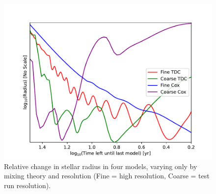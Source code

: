 \begin{figure}[H]
\begin{center}
    \includegraphics[width=0.8\linewidth]{Figures/Comparing-Radii.pdf}
    \caption{Relative change in stellar radius in four models, varying only by mixing theory and resolution (Fine = high resolution, Coarse = test run resolution).}
    \label{fig:Comparing-Radii}
\end{center}
\end{figure}